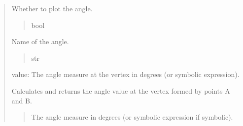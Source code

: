 \documentclass[letterpaper,10pt,english]{sphinxmanual}
\begin{document}
\begin{quote}
\begin{fulllineitems}
\begin{fulllineitems}
\begin{quote}
\begin{description}
\end{description}\end{quote}

\end{fulllineitems}


\begin{fulllineitems}
\label{\detokenize{pygeox:pygeox.basic_objects.Angle.plot}}
\pysigstartsignatures
\pysigline
{}
\pysigstopsignatures
\sphinxAtStartPar
Whether to plot the angle.
\begin{quote}\begin{description}
\sphinxAtStartPar
bool

\end{description}\end{quote}

\end{fulllineitems}


\begin{fulllineitems}
\label{\detokenize{pygeox:pygeox.basic_objects.Angle.name}}
\pysigstartsignatures
\pysigline
{}
\pysigstopsignatures
\sphinxAtStartPar
Name of the angle.
\begin{quote}\begin{description}
\sphinxAtStartPar
str

\end{description}\end{quote}

\end{fulllineitems}

\begin{description}
\sphinxAtStartPar
value: The angle measure at the vertex in degrees (or symbolic expression).

\end{description}

\begin{fulllineitems}
\label{\detokenize{pygeox:pygeox.basic_objects.Angle.value}}
\pysigstartsignatures
\pysigline
{}
\pysigstopsignatures
\sphinxAtStartPar
Calculates and returns the angle value at the vertex formed by points A and B.
\begin{quote}\begin{description}
\sphinxAtStartPar
The angle measure in degrees (or symbolic expression if symbolic).


\end{description}
\end{quote}
\end{fulllineitems}
\end{fulllineitems}
\end{quote}
\end{document}

